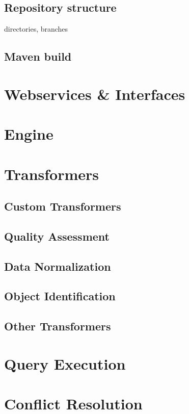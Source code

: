 \section{Repository structure}
directories, branches

\section{Maven build}

\chapter{Webservices \& Interfaces}

\chapter{Engine}

\chapter{Transformers}

\section{Custom Transformers}
\section{Quality Assessment}
\section{Data Normalization}
\section{Object Identification}
\section{Other Transformers}

\chapter{Query Execution}

\chapter{Conflict Resolution}

